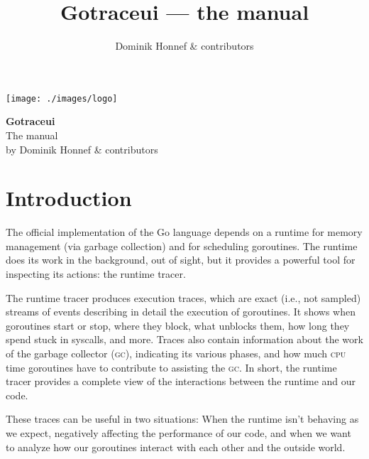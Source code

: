 \documentclass[10pt,letterpaper,oneside,openany,english]{memoir}
\title{Gotraceui --- the manual}
\author{Dominik Honnef \& contributors}
\begin{document}
\frontmatter

\begin{titlingpage}
\centering
\texttt{[image: ./images/logo]}

\begin{vplace}
{\HUGE\bfseries Gotraceui}\\[\baselineskip]
{\Huge The manual}\\[2\baselineskip]
{by Dominik Honnef \& contributors}\\
\end{vplace}
\end{titlingpage}

\tableofcontents
{}

\mainmatter


\chapter{Introduction}

The official implementation of the Go language depends on a runtime for memory management (via garbage collection) and for scheduling goroutines.
The runtime does its work in the background, out of sight, but it provides a powerful tool for inspecting its actions: the runtime tracer.

The runtime tracer produces execution traces, which are exact (i.e., not sampled) streams of events describing in detail the execution of goroutines.
It shows when goroutines start or stop, where they block, what unblocks them, how long they spend stuck in syscalls, and more.
Traces also contain information about the work of the garbage collector (\textsc{gc}), indicating its various phases, and how much \textsc{cpu} time goroutines have to contribute to assisting the \textsc{gc}.
In short, the runtime tracer provides a complete view of the interactions between the runtime and our code.

These traces can be useful in two situations:
When the runtime isn't behaving as we expect, negatively affecting the performance of our code,
and when we want to analyze how our goroutines interact with each other and the outside world.
\end{document}
